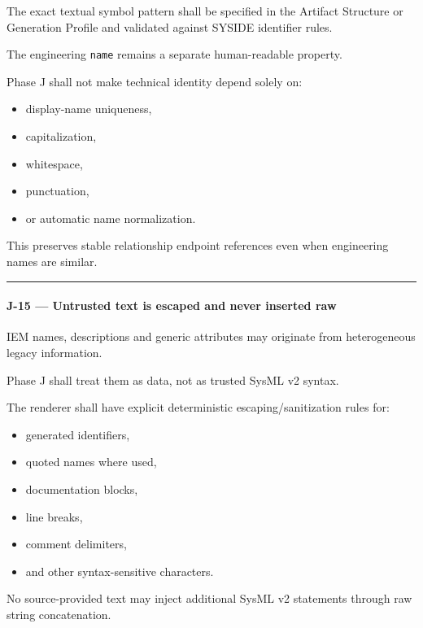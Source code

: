 The exact textual symbol pattern shall be specified in the Artifact Structure or Generation Profile and validated against SYSIDE identifier rules.

The engineering \texttt{name} remains a separate human-readable property.

Phase J shall not make technical identity depend solely on:

\begin{itemize}
\tightlist
\item
  display-name uniqueness,
\item
  capitalization,
\item
  whitespace,
\item
  punctuation,
\item
  or automatic name normalization.
\end{itemize}

This preserves stable relationship endpoint references even when engineering names are similar.

\begin{center}\rule{0.5\linewidth}{0.5pt}\end{center}

\hypertarget{j-15--untrusted-text-is-escaped-and-never-inserted-raw}{%
\paragraph{J-15 --- Untrusted text is escaped and never inserted raw}\label{j-15--untrusted-text-is-escaped-and-never-inserted-raw}}

IEM names, descriptions and generic attributes may originate from heterogeneous legacy information.

Phase J shall treat them as data, not as trusted SysML v2 syntax.

The renderer shall have explicit deterministic escaping/sanitization rules for:

\begin{itemize}
\tightlist
\item
  generated identifiers,
\item
  quoted names where used,
\item
  documentation blocks,
\item
  line breaks,
\item
  comment delimiters,
\item
  and other syntax-sensitive characters.
\end{itemize}

No source-provided text may inject additional SysML v2 statements through raw string concatenation.

